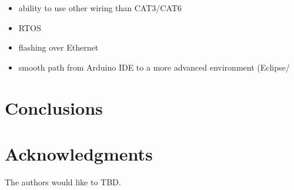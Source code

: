 \documentclass[draft,a4paper]{siamltex}
\begin{document}
\begin{itemize}
  \item ability to use other wiring than CAT3/CAT6
  \item RTOS
  \item flashing over Ethernet
  \item smooth path from Arduino IDE to a more advanced environment
    (Eclipse/
\end{itemize}


\section{Conclusions}
\label{sec:conclusions}

\section*{Acknowledgments}

The authors would like to TBD.

{}

\end{document}
